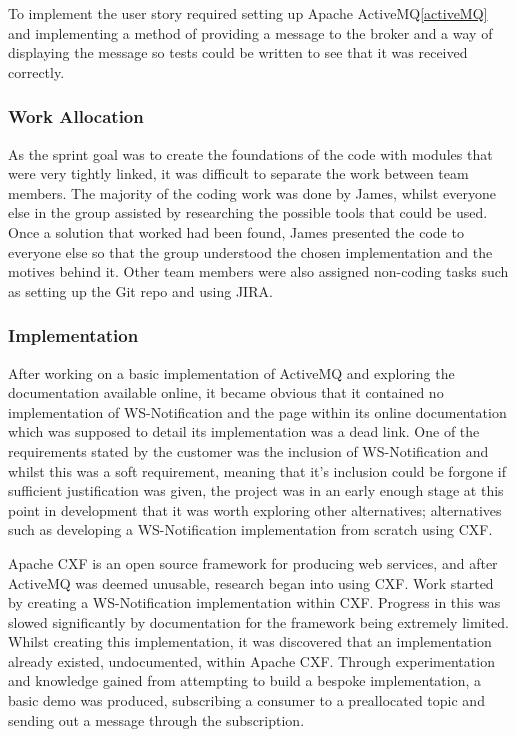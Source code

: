 \documentclass[a4paper, 12pt, twoside]{article}
\begin{document}
To implement the user story required setting up Apache ActiveMQ\ref{activeMQ} and implementing a method of providing a message to the broker and a way of displaying the message so tests could be written to see that it was received correctly.

\subsubsection{Work Allocation}

As the sprint goal was to create the foundations of the code with modules that were very tightly linked, it was difficult to separate the work between team members. The majority of the coding work was done by James, whilst everyone else in the group assisted by researching the possible tools that could be used. Once a solution that worked had been found, James presented the code to everyone else so that the group understood the chosen implementation and the motives behind it. Other team members were also assigned non-coding tasks such as setting up the Git repo and using JIRA.

\subsubsection{Implementation}

After working on a basic implementation of ActiveMQ and exploring the documentation available online, it became obvious that it contained no implementation of WS-Notification and the page within its online documentation which was supposed to detail its implementation was a dead link. One of the requirements stated by the customer was the inclusion of WS-Notification and whilst this was a soft requirement, meaning that it's inclusion could be forgone if sufficient justification was given, the project was in an early enough stage at this point in development that it was worth exploring other alternatives; alternatives such as developing a WS-Notification implementation from scratch using CXF.

Apache CXF is an open source framework for producing web services, and after ActiveMQ was deemed unusable, research began into using CXF. Work started by creating a WS-Notification implementation within CXF. Progress in this was slowed significantly by documentation for the framework being extremely limited. Whilst creating this implementation, it was discovered that an implementation already existed, undocumented, within Apache CXF. Through experimentation and knowledge gained from attempting to build a bespoke implementation, a basic demo was produced, subscribing a consumer to a preallocated topic and sending out a message through the subscription.
\end{document}
